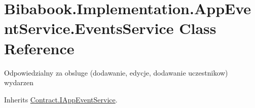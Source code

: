 \hypertarget{class_bibabook_1_1_implementation_1_1_app_event_service_1_1_events_service}{}\section{Bibabook.\+Implementation.\+App\+Event\+Service.\+Events\+Service Class Reference}
\label{class_bibabook_1_1_implementation_1_1_app_event_service_1_1_events_service}


Odpowiedzialny za obsluge (dodawanie, edycje, dodawanie uczestnikow) wydarzen  




Inherits \hyperlink{interface_contract_1_1_i_app_event_service}{Contract.\+I\+App\+Event\+Service}.

